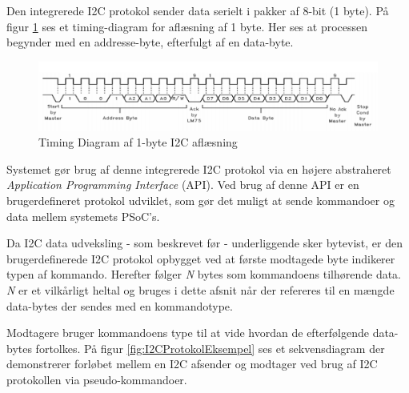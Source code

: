 Den integrerede I2C protokol sender data serielt i pakker af 8-bit (1 byte). På figur \ref{fig:I2CTimingDiagram} ses et timing-diagram for aflæsning af 1 byte. Her ses at processen  begynder med en addresse-byte, efterfulgt af en data-byte. 

\begin{figure}[H]
	\centering
	\includegraphics[width=\textwidth] {Systemarkitektur/images/I2CTimingDiagram}
	\caption{Timing Diagram af 1-byte I2C aflæsning}
	\label{fig:I2CTimingDiagram}
\end{figure}

Systemet gør brug af denne integrerede I2C protokol via en højere abstraheret \textit{Application Programming Interface} (API). Ved brug af denne API er en brugerdefineret protokol udviklet, som gør det muligt at sende kommandoer og data mellem systemets PSoC's.

Da I2C data udveksling - som beskrevet før - underliggende sker bytevist, er den brugerdefinerede I2C protokol opbygget ved at første modtagede byte indikerer typen af kommando. Herefter følger \textit{N} bytes som kommandoens tilhørende data. \textit{N} er et vilkårligt heltal og bruges i dette afsnit når der refereres til en mængde data-bytes der sendes med en kommandotype.

Modtagere bruger kommandoens type til at vide hvordan de efterfølgende data-bytes fortolkes. På figur \ref{fig:I2CProtokolEksempel} ses et sekvensdiagram der demonstrerer forløbet mellem en I2C afsender og modtager ved brug af I2C protokollen via pseudo-kommandoer.

